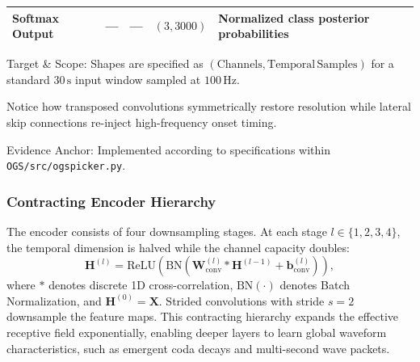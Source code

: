 \begin{table}[htbp]
\begin{threeparttable}
\begin{tabularx}{\linewidth}{l c c c X}
      Softmax Output & --- & --- & $(3, 3000)$ & Normalized class posterior probabilities \\
      \bottomrule
    \end{tabularx}
    \begin{tablenotes}[flushleft]
      \footnotesize
      \item[a] Target \& Scope: Shapes are specified as $(\mathrm{Channels}, \mathrm{Temporal\,Samples})$ for a standard $30\,\mathrm{s}$ input window sampled at $100\,\mathrm{Hz}$.
      \item Notice how transposed convolutions symmetrically restore resolution while lateral skip connections re-inject high-frequency onset timing.
      \item Evidence Anchor: Implemented according to \cite{PhaseNet} specifications within \texttt{OGS/src/ogspicker.py}.
    \end{tablenotes}
  \end{threeparttable}
\end{table}

\subsubsection{Contracting Encoder Hierarchy}
The encoder consists of four downsampling stages. At each stage $l \in \{1, 2, 3, 4\}$, the temporal dimension is halved while the channel capacity doubles:
\begin{equation}
  \mathbf{H}^{(l)} = \mathrm{ReLU}\left( \mathrm{BN}\left( \mathbf{W}_{\mathrm{conv}}^{(l)} * \mathbf{H}^{(l-1)} + \mathbf{b}_{\mathrm{conv}}^{(l)} \right) \right),
\end{equation}
where $*$ denotes discrete 1D cross-correlation, $\mathrm{BN}(\cdot)$ denotes Batch Normalization, and $\mathbf{H}^{(0)} = \mathbf{X}$. Strided convolutions with stride $s=2$ downsample the feature maps. This contracting hierarchy expands the effective receptive field exponentially, enabling deeper layers to learn global waveform characteristics, such as emergent coda decays and multi-second wave packets.

